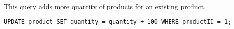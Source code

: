 This query adds more quantity of products for an existing product.

\begin{lstlisting}
UPDATE product SET quantity = quantity + 100 WHERE productID = 1;
\end{lstlisting}